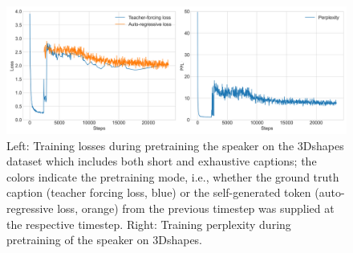 \begin{figure}[h]
	\centering
	\includegraphics[width=\linewidth]{images/3dshapes_wShort_pretraining_losses_ppls.png}
	\caption{Left: Training losses during pretraining the speaker on the 3Dshapes dataset which includes both short and exhaustive captions; the colors indicate the pretraining mode, i.e., whether the ground truth caption (teacher forcing loss, blue) or the self-generated token (auto-regressive loss, orange) from the previous timestep was supplied at the respective timestep. Right: Training perplexity during pretraining of the speaker on 3Dshapes.}
	\label{fig:3dshapes_pretraining_wShort}
\end{figure}  

